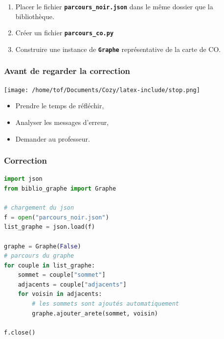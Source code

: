 \documentclass[svgnames,11pt]{beamer}
\begin{document}
\begin{frame}
\begin{center}
\begin{tikzpicture}
        \end{tikzpicture}
    \end{center}

    

\end{frame}
\begin{frame}
    \frametitle{}

    \begin{activite}
    \begin{enumerate}
        \item Placer le fichier \textbf{\texttt{parcours\_noir.json}} dans le même dossier que la bibliothèque.
        \item Créer un fichier \textbf{\texttt{parcours\_co.py}}
        \item Construire une instance de \textbf{\texttt{Graphe}} représentative de la carte de CO.
    \end{enumerate}
    \end{activite}

\end{frame}
\begin{frame}
    \frametitle{Avant de regarder la correction}
\begin{center}
    \centering
    \texttt{[image: /home/tof/Documents/Cozy/latex-include/stop.png]}
    \end{center}
{\Large
    \begin{itemize}
        \item Prendre le temps de réfléchir,
        \item Analyser les messages d'erreur,
        \item Demander au professeur.
    \end{itemize}
}
\end{frame}
\begin{frame}[fragile]
    \frametitle{Correction}
\begin{center}
\begin{lstlisting}[language=Python , basicstyle=\ttfamily\small, xleftmargin=0.2em, xrightmargin=0em]
import json
from biblio_graphe import Graphe

# chargement du json
f = open("parcours_noir.json")
list_graphe = json.load(f)

graphe = Graphe(False)
# parcours du graphe
for couple in list_graphe:
    sommet = couple["sommet"]
    adjacents = couple["adjacents"]
    for voisin in adjacents:
        # les sommets sont ajoutés automatiquement
        graphe.ajouter_arete(sommet, voisin)
        
f.close()
\end{lstlisting}
\end{center}
    

\end{frame}
\end{document}
